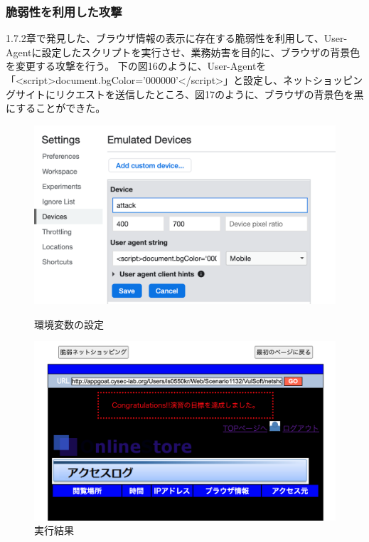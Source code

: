 \documentclass[dvipdfmx,autodetect-engine,titlepage]{jsarticle}
\begin{document}
\subsubsection{脆弱性を利用した攻撃}
1.7.2章で発見した、ブラウザ情報の表示に存在する脆弱性を利用して、User-Agentに設定したスクリプトを実行させ、業務妨害を目的に、ブラウザの背景色を変更する攻撃を行う。
下の図16のように、User-Agentを「\textless script\textgreater document.bgColor='000000'\textless /script\textgreater」と設定し、ネットショッピングサイトにリクエストを送信したところ、図17のように、ブラウザの背景色を黒にすることができた。\\

\begin{figure}[H]
  \centering
  \begin{minipage}[b]{0.45\linewidth}
  \begin{center}
    \includegraphics[keepaspectratio,scale=0.35]{web16.png}
    \end{center}
    \caption{環境変数の設定}
  \end{minipage}
  \begin{minipage}[b]{0.45\linewidth}
  \begin{center}
    \includegraphics[keepaspectratio,scale=0.3]{web17.png}
    \end{center}
    \caption{実行結果}
  \end{minipage}
\end{figure}
\end{document}
